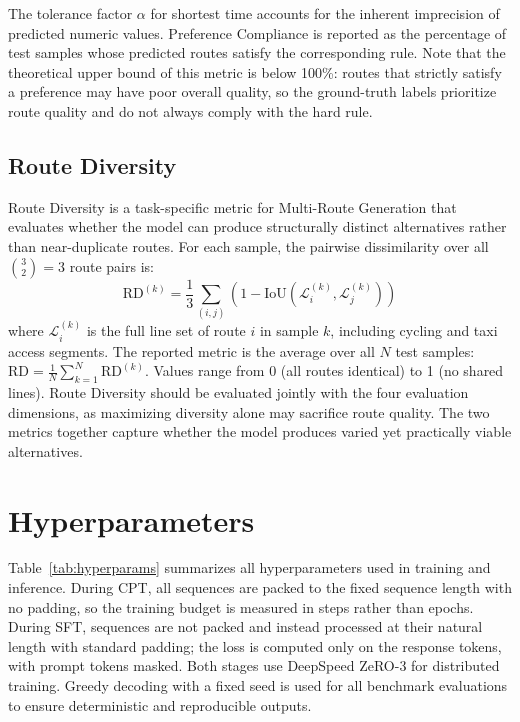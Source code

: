 \documentclass{llmxive}
\begin{document}
\noindent The tolerance factor $\alpha$ for shortest time accounts for the inherent imprecision of predicted numeric values. Preference Compliance is reported as the percentage of test samples whose predicted routes satisfy the corresponding rule. Note that the theoretical upper bound of this metric is below 100\%: routes that strictly satisfy a preference may have poor overall quality, so the ground-truth labels prioritize route quality and do not always comply with the hard rule.

\subsection{Route Diversity}

Route Diversity is a task-specific metric for Multi-Route Generation that evaluates whether the model can produce structurally distinct alternatives rather than near-duplicate routes. For each sample, the pairwise dissimilarity over all $\binom{3}{2} = 3$ route pairs is:
\begin{equation}
\text{RD}^{(k)} = \frac{1}{3}\sum_{(i,j)}(1 - \text{IoU}(\mathcal{L}_i^{(k)}, \mathcal{L}_j^{(k)}))
\end{equation}
where $\mathcal{L}_i^{(k)}$ is the full line set of route $i$ in sample $k$, including cycling and taxi access segments. The reported metric is the average over all $N$ test samples: $\text{RD} = \frac{1}{N}\sum_{k=1}^{N}\text{RD}^{(k)}$. Values range from 0 (all routes identical) to 1 (no shared lines). Route Diversity should be evaluated jointly with the four evaluation dimensions, as maximizing diversity alone may sacrifice route quality. The two metrics together capture whether the model produces varied yet practically viable alternatives.

\section{Hyperparameters}
\label{app:hyperparams}

Table~\ref{tab:hyperparams} summarizes all hyperparameters used in training and inference. During CPT, all sequences are packed to the fixed sequence length with no padding, so the training budget is measured in steps rather than epochs. During SFT, sequences are not packed and instead processed at their natural length with standard padding; the loss is computed only on the response tokens, with prompt tokens masked. Both stages use DeepSpeed ZeRO-3 \cite{rajbhandari2020zero} for distributed training. Greedy decoding with a fixed seed is used for all benchmark evaluations to ensure deterministic and reproducible outputs.
\end{document}

